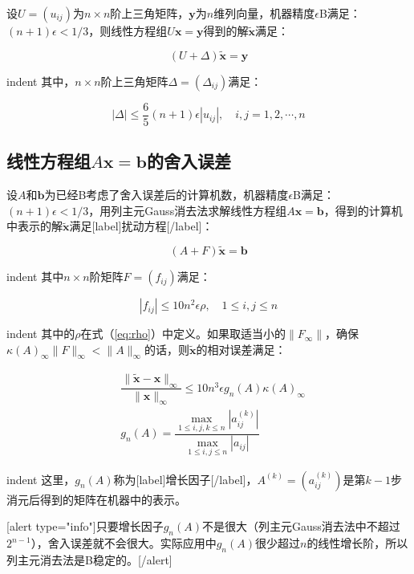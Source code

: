 \documentclass[UTF8,nofonts]{ctexart}
\begin{document}
设$U=(u_{ij})$为$n \times n$阶上三角矩阵，$\boldsymbol{y}$为$n$维列向量，机器精度$\epsilon$B满足：$(n+1)\epsilon<1/3$，则线性方程组$U\boldsymbol{x}=\boldsymbol{y}$得到的解$\tilde{\boldsymbol{x}}$满足：

\[(U+\Delta)\tilde{\boldsymbol{x}}=\boldsymbol{y}\]

indent 其中，$n \times n$阶上三角矩阵$\Delta=(\Delta_{ij})$满足：

\[|\Delta| \leq \dfrac{6}{5}(n+1)\epsilon|u_{ij}|,\quad i,j=1,2,\cdots,n\]

\subsection*{线性方程组$A\boldsymbol{x}=\boldsymbol{b}$的舍入误差}

设$A$和$\boldsymbol{b}$为已经B考虑了舍入误差后的计算机数，机器精度$\epsilon$B满足：$(n+1)\epsilon<1/3$，用列主元Gauss消去法求解线性方程组$A\boldsymbol{x}=\boldsymbol{b}$，得到的计算机中表示的解$\tilde{\boldsymbol{x}}$满足[label]扰动方程[/label]：

\[(A+F)\tilde{\boldsymbol{x}}=\boldsymbol{b}\]

indent 其中$n \times n$阶矩阵$F=(f_{ij})$满足：

\[|f_{ij}|\leq 10n^2\epsilon\rho,\quad 1\leq i,j \leq n\]

indent 其中的$\rho$在式（\ref{eq:rho}）中定义。如果取适当小的$\|F_{\infty}\|$，确保$\kappa(A)_\infty\|F\|_\infty<\|A\|_\infty$的话，则$\tilde{\boldsymbol{x}}$的相对误差满足：

\begin{eqnarray*}
&\dfrac{\|\tilde{\boldsymbol{x}}-\boldsymbol{x}\|_\infty}{\|\boldsymbol{x}\|_\infty}
\leq 10n^3\epsilon g_n(A)\kappa(A)_\infty\\
&g_n(A)=\dfrac{\max_{1\leq i,j,k \leq n}{|a_{ij}^{(k)}|}}{\max_{1\leq i,j \leq n}{|a_{ij}|}}
\end{eqnarray*}

indent 这里，$g_n(A)$称为[label]增长因子[/label]，$A^{(k)}=\left(a_{ij}^{(k)}\right)$是第$k-1$步消元后得到的矩阵在机器中的表示。

[alert type="info"]只要增长因子$g_{n}(A)$不是很大（列主元Gauss消去法中不超过$2^{n-1}$），舍入误差就不会很大。实际应用中$g_n(A)$很少超过$n$的线性增长阶，所以列主元消去法是B稳定的。[/alert]
\end{document}

